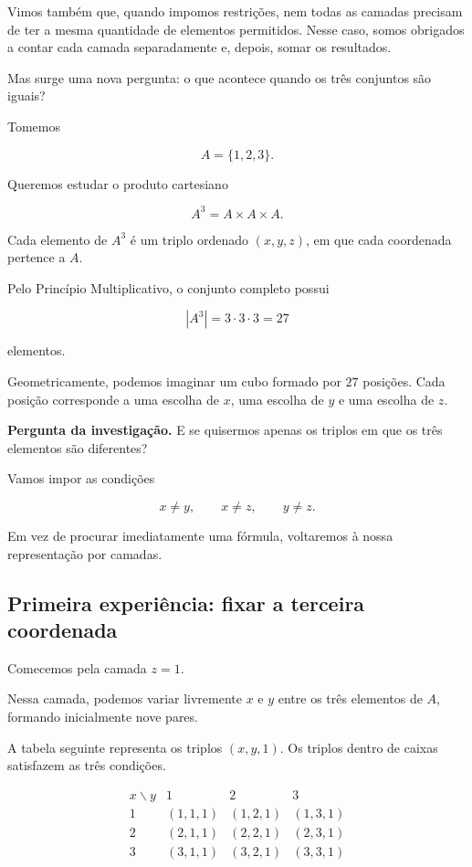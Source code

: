 \documentclass[11pt,a4paper,oneside]{book}
\newcommand{\Pergunta}[1]{\begin{perguntabox}\textbf{Pergunta da investigação.} #1\end{perguntabox}}
\begin{document}
Vimos também que, quando impomos restrições, nem todas as
camadas precisam de ter a mesma quantidade de elementos
permitidos. Nesse caso, somos obrigados a contar cada camada
separadamente e, depois, somar os resultados.

Mas surge uma nova pergunta: o que acontece quando os três
conjuntos são iguais?

Tomemos

\[
A=\{1,2,3\}.
\]

Queremos estudar o produto cartesiano

\[
A^3=A\times A\times A.
\]

Cada elemento de $A^3$ é um triplo ordenado $(x,y,z)$,
em que cada coordenada pertence a $A$.

Pelo Princípio Multiplicativo, o conjunto completo possui

\[
|A^3|=3\cdot3\cdot3=27
\]

elementos.

Geometricamente, podemos imaginar um cubo formado por
$27$ posições. Cada posição corresponde a uma escolha de
$x$, uma escolha de $y$ e uma escolha de $z$.

\Pergunta{E se quisermos apenas os triplos em que os três
elementos são diferentes?}

Vamos impor as condições

\[
x\neq y,\qquad x\neq z,\qquad y\neq z.
\]

Em vez de procurar imediatamente uma fórmula, voltaremos
à nossa representação por camadas.

\subsection*{Primeira experiência: fixar a terceira coordenada}

Comecemos pela camada $z=1$.

Nessa camada, podemos variar livremente $x$ e $y$ entre
os três elementos de $A$, formando inicialmente nove pares.

A tabela seguinte representa os triplos $(x,y,1)$.
Os triplos dentro de caixas satisfazem as três condições.

\[
\begin{array}{c|ccc}
x\backslash y & 1 & 2 & 3\\ \hline
1 &(1,1,1)&(1,2,1)&(1,3,1)\\[3pt]
2 &(2,1,1)&(2,2,1)&\boxed{(2,3,1)}\\[3pt]
3 &(3,1,1)&\boxed{(3,2,1)}&(3,3,1)
\end{array}
\]
\end{document}
